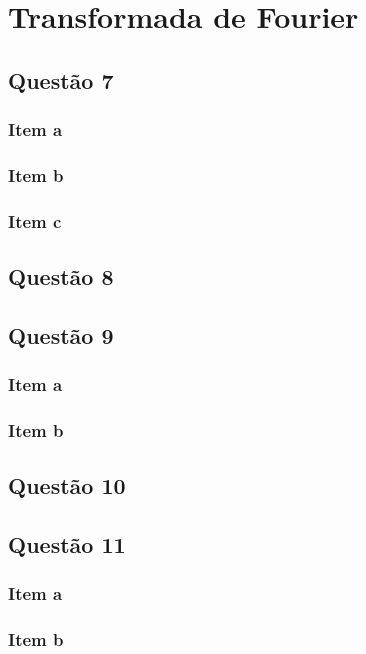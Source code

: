 \documentclass[a4paper, 12pt]{article}
\begin{document}
	\section{Transformada de Fourier}    
		\subsection{Questão 7} 
			\subsubsection{Item a}
			\subsubsection{Item b}			   		   
			\subsubsection{Item c}			   			
		\subsection{Questão 8}    
		\subsection{Questão 9}  
			\subsubsection{Item a}
			\subsubsection{Item b}			  
		\subsection{Questão 10}    
		\subsection{Questão 11}     
			\subsubsection{Item a}
			\subsubsection{Item b}			  		
\end{document}

